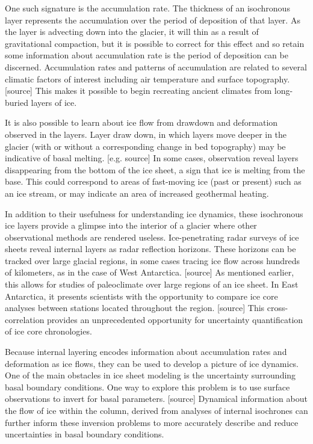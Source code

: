 \documentclass[draft,jgrga]{agutex}
\begin{document}
One such signature is
	the accumulation rate.  The thickness of an isochronous layer
	represents the accumulation over the period of deposition of
	that layer. As the layer is advecting down into the glacier,
	it will thin as a result of gravitational compaction, but it
	is possible to correct for this effect and so retain some
	information about accumulation rate is the period of
	deposition can be discerned. Accumulation rates and patterns
	of accumulation are related to several climatic factors of
	interest including air temperature and surface
	topography. [source] This makes it possible to begin
	recreating ancient climates from long-buried layers of ice. 
	
It is also possible to learn about ice flow from drawdown and
	deformation observed in the layers. Layer draw down, in which
	layers move deeper in the glacier (with or without a
	corresponding change in bed topography) may be indicative of
	basal melting. [e.g. source] In some cases, observation reveal
	layers disappearing from the bottom of the ice sheet, a sign
	that ice is melting from the base. This could correspond to
	areas of fast-moving ice (past or present) such as an ice
	stream, or may indicate an area of increased geothermal
	heating.  


In addition to their usefulness for
	understanding ice dynamics, these isochronous ice layers
	provide a glimpse into the interior of a glacier where other
	observational methods are rendered useless. Ice-penetrating
	radar surveys of ice sheets reveal internal layers as radar
	reflection horizons. These horizons can be tracked over large
	glacial regions, in some cases tracing ice flow across
	hundreds of kilometers, as in the case of West
	Antarctica. [source] As mentioned earlier, this allows for
	studies of paleoclimate over large regions of an ice sheet. In
	East Antarctica, it presents scientists with the opportunity
	to compare ice core analyses between stations located
	throughout the region. [source] This cross-correlation
	provides an unprecedented opportunity for uncertainty
	quantification of ice core chronologies. 

Because internal layering encodes information about accumulation rates
	and deformation as ice flows, they can be used to develop a
	picture of ice dynamics. One of the main obstacles in ice
	sheet modeling is the uncertainty surrounding basal boundary
	conditions. One way to explore this problem is to use surface
	observations to invert for basal parameters. [source]
	Dynamical information about the flow of ice within the column,
	derived from analyses of internal isochrones can further
	inform these inversion problems to more accurately describe
	and reduce uncertainties in basal boundary conditions. 
\end{document}
